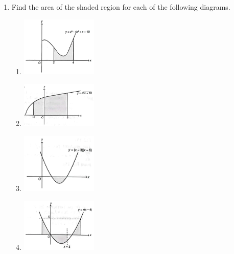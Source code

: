 \documentclass{report}
\begin{document}
\begin{multicols*}{2}
\begin{enumerate}
            \item Find the area of the shaded region for each of the following diagrams.
                  \begin{enumerate}
                        \item \includegraphics[width=0.3\textwidth,valign=t]{./images/1.png}
                        \item \includegraphics[width=0.3\textwidth,valign=t]{./images/2.png}
                        \item \includegraphics[width=0.3\textwidth,valign=t]{./images/3.png}
                        \item \includegraphics[width=0.3\textwidth,valign=t]{./images/4.png}
                  \end{enumerate}


\end{enumerate}
\end{multicols*}
\end{document}
